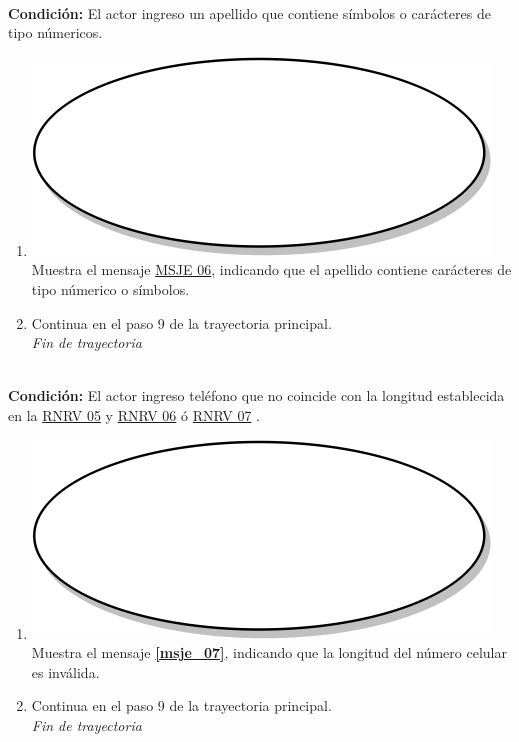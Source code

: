 \textbf{} \\
\textbf{Condición:} El actor ingreso un apellido que contiene símbolos o carácteres de tipo númericos.\\
 \begin{enumerate}[label=E\arabic*]
    \item {\includegraphics[scale=.05]{Capitulo3/img/proceso.png} Muestra el mensaje \hyperref[msje_06]{MSJE 06}, indicando que el apellido contiene carácteres de tipo númerico o símbolos.}
    \item {Continua en el paso 9 de la trayectoria principal.} \\
    \textit{Fin de trayectoria} \\
\end{enumerate}

\textbf{} \\
\textbf{Condición:} El actor ingreso teléfono que no coincide con la longitud establecida en la \hyperref[rnrv_05]{RNRV 05} y \hyperref[rnrv_06]{RNRV 06} ó \hyperref[rnrv_07]{RNRV 07} .\\
 \begin{enumerate}[label=F\arabic*]
    \item {\includegraphics[scale=.05]{Capitulo3/img/proceso.png} Muestra el mensaje \textbf{\ref{msje_07}}, indicando que la longitud del número celular es inválida.}
    \item {Continua en el paso 9 de la trayectoria principal.} \\
    \textit{Fin de trayectoria} \\
\end{enumerate}

